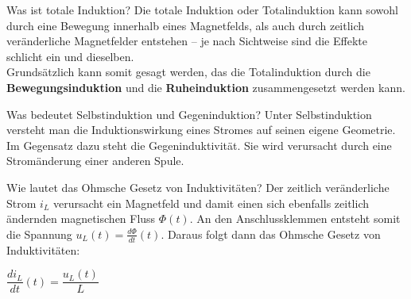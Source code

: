 \begin{karte}{Was ist totale Induktion?}
	Die totale Induktion oder Totalinduktion kann sowohl durch eine Bewegung innerhalb eines Magnetfelds, als auch durch zeitlich veränderliche Magnetfelder entstehen – je nach Sichtweise sind die Effekte schlicht ein und dieselben.\\
	Grundsätzlich kann somit gesagt werden, das die Totalinduktion durch die \textbf{Bewegungsinduktion} und die \textbf{Ruheinduktion} zusammengesetzt werden kann.
\end{karte}

\begin{karte}{Was bedeutet Selbstinduktion und Gegeninduktion?}
	Unter Selbstinduktion versteht man die Induktionswirkung eines Stromes auf seinen eigene Geometrie. Im Gegensatz dazu steht die Gegeninduktivität. Sie wird verursacht durch eine Stromänderung einer anderen Spule.
\end{karte}

\begin{karte}{Wie lautet das Ohmsche Gesetz von Induktivitäten?}	
	Der zeitlich veränderliche Strom $i_{L}$ verursacht ein Magnetfeld und damit einen sich ebenfalls zeitlich ändernden magnetischen Fluss $\Phi(t)$. An den Anschlussklemmen entsteht somit die Spannung $u_{L}(t)=\frac{d \Phi}{d t}(t)$.
	Daraus folgt dann das Ohmsche Gesetz von Induktivitäten:
	\begin{center}
		\huge
		$\dfrac{d i_{L}}{d t}(t)=\dfrac{u_{L}(t)}{L}$
	\end{center}
\end{karte}

